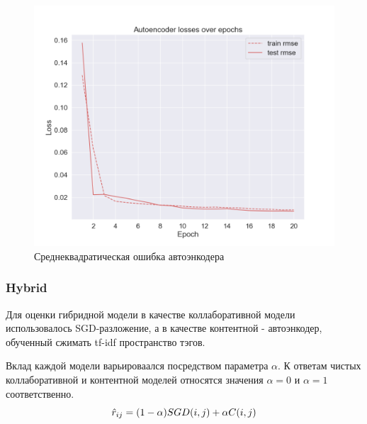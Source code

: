 \begin{figure}[h!]
\centering
\begin{minipage}{0.6\textwidth}
\centering
\includegraphics[width=0.85\linewidth]{images/content/autoencoder_losses}
\caption{Среднеквадратическая ошибка автоэнкодера}
\label{fig:autoencoder_losses}
\end{minipage}%
\end{figure}

\pagebreak

\subsubsection{Hybrid}
Для оценки гибридной модели в качестве коллаборативной модели использовалось SGD-разложение, а в качестве контентной - автоэнкодер, обученный сжимать tf-idf пространство тэгов.

Вклад каждой модели варьироваался посредством параметра $\alpha$.
К ответам чистых коллаборативной и контентной моделей относятся значения $\alpha = 0$ и $\alpha = 1$ соответственно.
\begin{equation}\label{eq:hybrid_filtering}
\hat{r}_{ij} = (1 - \alpha)\space SGD(i, j) + \alpha\space C(i, j)
\end{equation}

